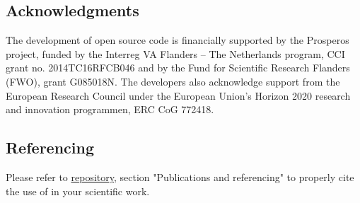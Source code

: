 \subsection{Acknowledgments}
The development of \biodeg{} open source code is financially supported by the Prosperos project, funded by the Interreg VA Flanders – The Netherlands program, CCI grant no. 2014TC16RFCB046 and by the Fund for Scientific Research Flanders (FWO), grant G085018N. The developers also acknowledge support from the European Research Council under the European Union's Horizon 2020 research and innovation programmen, ERC CoG 772418.

\subsection{Referencing \biodeg{}}

Please refer to \href{https://github.com/mbarzegary/BioDeg}{\biodeg{} repository}, section "Publications and referencing" to properly cite the use of 
\biodeg{} in your scientific work. 
